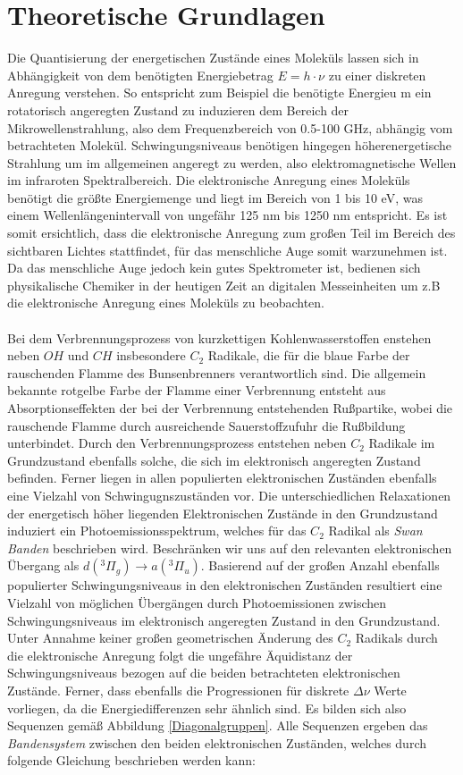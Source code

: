 %
%

\section{Theoretische Grundlagen}
Die Quantisierung der energetischen Zustände eines Moleküls lassen sich in Abhängigkeit von dem benötigten Energiebetrag $E = h \cdot \nu$ zu einer diskreten Anregung verstehen. So entspricht zum Beispiel die benötigte Energieu m ein rotatorisch angeregten Zustand zu induzieren dem Bereich der Mikrowellenstrahlung, also dem Frequenzbereich von 0.5-100 GHz, abhängig vom betrachteten Molekül. Schwingungsniveaus benötigen hingegen höherenergetische Strahlung um im allgemeinen angeregt zu werden, also elektromagnetische Wellen im infraroten Spektralbereich. Die elektronische Anregung eines Moleküls benötigt die größte Energiemenge und liegt im Bereich von 1 bis 10 eV, was einem Wellenlängenintervall von ungefähr 125 nm bis 1250 nm entspricht. Es ist somit ersichtlich, dass die elektronische Anregung zum großen Teil im Bereich des sichtbaren Lichtes stattfindet, für das menschliche Auge somit warzunehmen ist. Da das menschliche Auge jedoch kein gutes Spektrometer ist, bedienen sich physikalische Chemiker in der heutigen Zeit an digitalen Messeinheiten um z.B die elektronische Anregung eines Moleküls zu beobachten.\\
\\
Bei dem Verbrennungsprozess von kurzkettigen Kohlenwasserstoffen enstehen neben $OH$ und $CH$ insbesondere $C_2$ Radikale, die für die blaue Farbe der rauschenden Flamme des Bunsenbrenners verantwortlich sind. Die allgemein bekannte rotgelbe Farbe der Flamme einer Verbrennung entsteht aus Absorptionseffekten der bei der Verbrennung entstehenden Rußpartike, wobei die rauschende Flamme durch ausreichende Sauerstoffzufuhr die Rußbildung unterbindet. Durch den Verbrennungsprozess entstehen neben $C_2$ Radikale im Grundzustand ebenfalls solche, die sich im elektronisch angeregten Zustand befinden. Ferner liegen in allen populierten elektronischen Zuständen ebenfalls eine Vielzahl von Schwingugnszuständen vor. Die unterschiedlichen Relaxationen der energetisch höher liegenden Elektronischen Zustände in den Grundzustand  induziert ein Photoemissionsspektrum, welches für das $C_2$ Radikal als \textit{Swan Banden} beschrieben wird. Beschränken wir uns auf den relevanten elektronischen Übergang als $d(^3\Pi_g) \rightarrow a(^3\Pi_u)$. Basierend auf der großen Anzahl ebenfalls populierter Schwingungsniveaus in den elektronischen Zuständen resultiert eine Vielzahl von möglichen Übergängen durch Photoemissionen zwischen Schwingungsniveaus im elektronisch angeregten Zustand in den Grundzustand. Unter Annahme keiner großen geometrischen Änderung des $C_2$ Radikals durch die elektronische Anregung folgt die ungefähre Äquidistanz der Schwingungsniveaus bezogen auf die beiden betrachteten elektronischen Zustände. Ferner, dass ebenfalls die Progressionen für diskrete $\Delta \nu$ Werte vorliegen, da die Energiedifferenzen sehr ähnlich sind. Es bilden sich also Sequenzen gemäß Abbildung \ref{Diagonalgruppen}. Alle Sequenzen ergeben das \textit{Bandensystem} zwischen den beiden elektronischen Zuständen, welches durch folgende Gleichung beschrieben werden kann: 
